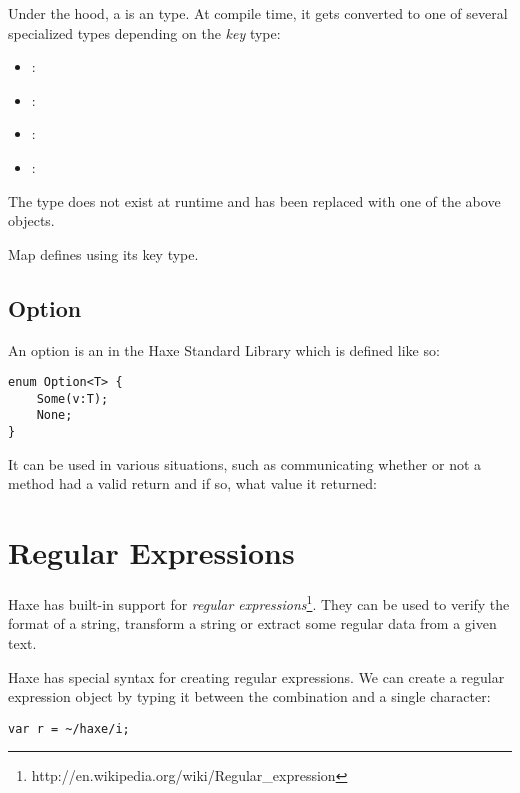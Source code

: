 Under the hood, a  is an  type. At compile time, it gets converted to one of several specialized types depending on the \emph{key} type:
\begin{itemize}
	\item {}: 
	\item {}: 
	\item {}: 
	\item \type{\{\}}: 
\end{itemize}

The  type does not exist at runtime and has been replaced with one of the above objects. 

Map defines  using its key type.


\subsection{Option}
\label{std-Option}

An option is an  in the Haxe Standard Library which is defined like so:

\begin{lstlisting}
enum Option<T> {
	Some(v:T);
	None;
}
\end{lstlisting}

It can be used in various situations, such as communicating whether or not a method had a valid return and if so, what value it returned:




\section{Regular Expressions}
\label{std-regex}

Haxe has built-in support for \emph{regular expressions}\footnote{http://en.wikipedia.org/wiki/Regular_expression}. They can be used to verify the format of a string, transform a string or extract some regular data from a given text.

Haxe has special syntax for creating regular expressions. We can create a regular expression object by typing it between the \expr{\textasciitilde/} combination and a single \expr{/} character:

\begin{lstlisting}
var r = ~/haxe/i;
\end{lstlisting}

